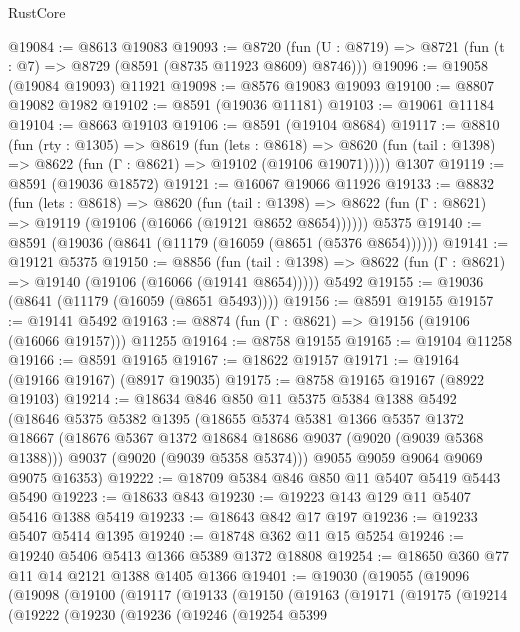 \begin{lexlean}{RustCore}
\begin{coremodule}
@19084 := @8613 @19083
@19093 := @8720
    (fun (U : @8719) => @8721 (fun (t : @7) => @8729 (@8591 (@8735 @11923 @8609) @8746)))
@19096 := @19058 (@19084 @19093) @11921
@19098 := @8576 @19083 @19093
@19100 := @8807 @19082 @1982
@19102 := @8591 (@19036 @11181)
@19103 := @19061 @11184
@19104 := @8663 @19103
@19106 := @8591 (@19104 @8684)
@19117 := @8810
    (fun (rty : @1305) =>
    @8619
      (fun (lets : @8618) =>
      @8620 (fun (tail : @1398) => @8622 (fun (Γ : @8621) => @19102 (@19106 @19071)))))
    @1307
@19119 := @8591 (@19036 @18572)
@19121 := @16067 @19066 @11926
@19133 := @8832
    (fun (lets : @8618) =>
    @8620
      (fun (tail : @1398) =>
      @8622 (fun (Γ : @8621) => @19119 (@19106 (@16066 (@19121 @8652 @8654))))))
    @5375
@19140 := @8591 (@19036 (@8641 (@11179 (@16059 (@8651 (@5376 @8654))))))
@19141 := @19121 @5375
@19150 := @8856
    (fun (tail : @1398) => @8622 (fun (Γ : @8621) => @19140 (@19106 (@16066 (@19141 @8654)))))
    @5492
@19155 := @19036 (@8641 (@11179 (@16059 (@8651 @5493))))
@19156 := @8591 @19155
@19157 := @19141 @5492
@19163 := @8874 (fun (Γ : @8621) => @19156 (@19106 (@16066 @19157))) @11255
@19164 := @8758 @19155
@19165 := @19104 @11258
@19166 := @8591 @19165
@19167 := @18622 @19157
@19171 := @19164 (@19166 @19167) (@8917 @19035)
@19175 := @8758 @19165 @19167 (@8922 @19103)
@19214 := @18634
    @846
    @850
    @11
    @5375
    @5384
    @1388
    @5492
    (@18646
      @5375
      @5382
      @1395
      (@18655
        @5374
        @5381
        @1366
        @5357
        @1372
        @18667
        (@18676 @5367 @1372 @18684 @18686 @9037 (@9020 (@9039 @5368 @1388)))
        @9037
        (@9020 (@9039 @5358 @5374)))
      @9055
      @9059
      @9064
      @9069
      @9075
      @16353)
@19222 := @18709 @5384 @846 @850 @11 @5407 @5419 @5443 @5490
@19223 := @18633 @843
@19230 := @19223 @143 @129 @11 @5407 @5416 @1388 @5419
@19233 := @18643 @842 @17 @197
@19236 := @19233 @5407 @5414 @1395
@19240 := @18748 @362 @11 @15 @5254
@19246 := @19240 @5406 @5413 @1366 @5389 @1372 @18808
@19254 := @18650 @360 @77 @11 @14 @2121 @1388 @1405 @1366
@19401 := @19030
    (@19055
      (@19096
        (@19098
          (@19100
            (@19117
              (@19133
                (@19150
                  (@19163
                    (@19171
                      (@19175
                        (@19214
                          (@19222
                            (@19230
                              (@19236
                                (@19246
                                  (@19254
                                    @5399

\end{coremodule}
\end{lexlean}
